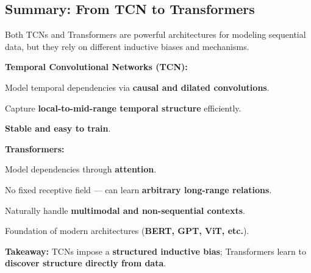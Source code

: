 \subsection{Summary: From TCN to Transformers}

Both TCNs and Transformers are powerful architectures for modeling sequential data, but they rely on different inductive biases and mechanisms.

\begin{compactitemize}
    \item \textbf{Temporal Convolutional Networks (TCN):}
    \begin{compactitemize}
        \item Model temporal dependencies via \textbf{causal and dilated convolutions}.
        \item Capture \textbf{local-to-mid-range temporal structure} efficiently.
        \item \textbf{Stable and easy to train}.
    \end{compactitemize}
    
    \item \textbf{Transformers:}
    \begin{compactitemize}
        \item Model dependencies through \textbf{attention}.
        \item No fixed receptive field — can learn \textbf{arbitrary long-range relations}.
        \item Naturally handle \textbf{multimodal and non-sequential contexts}.
        \item Foundation of modern architectures (\textbf{BERT, GPT, ViT, etc.}).
    \end{compactitemize}
\end{compactitemize}

\textbf{Takeaway:} TCNs impose a \textbf{structured inductive bias}; Transformers learn to \textbf{discover structure directly from data}.

